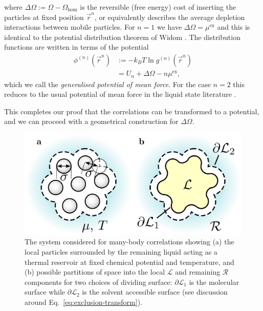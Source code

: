\documentclass[11pt,twoside]{report}
\begin{document}
where $\Delta\Omega := \Omega - \Omega_\mathrm{hom}$ is the reversible (free energy) cost of inserting the particles at fixed position $\vec{r}^n$, or equivalently describes the average depletion interactions between mobile particles.
For $n=1$ we have $\Delta\Omega = \mu^\mathrm{ex}$ and this is identical to the potential distribution theorem of Widom \cite{WidomJCP1963,WidomJPC1982}.
The distribution functions are written in terms of the potential
\begin{equation}\label{eq:potential-mean-force}
  \begin{split}
    \phi^{(n)}(\vec{r}^n) &:=
    - k_B T \ln{g^{(n)}(\vec{r}^n)} \\
    &=
    U_n + \Delta\Omega - n\mu^\mathrm{ex},
  \end{split}
\end{equation}
which we call the \emph{generalised potential of mean force}.
For the case $n=2$ this reduces to the usual potential of mean force in the liquid state literature \cite{Hansen2013}.

This completes our proof that the correlations can be transformed to a potential, and we can proceed with a geometrical construction for $\Delta \Omega$.

\begin{figure}
  \includegraphics[width=\linewidth,outer]{morph-droplet}
  \caption[Our system: correlations as solvation physics]{
    The system considered for many-body correlations showing
    (a) the local particles surrounded by the remaining liquid acting as a thermal reservoir at fixed chemical potential and temperature, and
    (b) possible partitions of space into the local $\mathcal{L}$ and remaining $\mathcal{R}$ components for two choices of dividing surface: $\partial\mathcal{L}_1$ is the molecular surface while $\partial\mathcal{L}_2$ is the solvent accessible surface (see discussion around Eq.\ \eqref{eq:exclusion-transform}).
  }
  \label{fig:system}
\end{figure}
\end{document}
